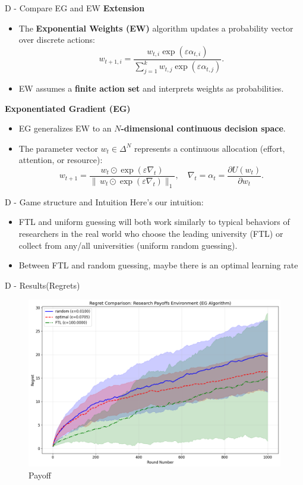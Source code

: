 \documentclass{beamer}
\begin{document}
\begin{frame}{D - Compare EG and EW}
\textbf{Extension}
    \begin{itemize}
        \item The \textbf{Exponential Weights (EW)} algorithm updates 
              a probability vector over discrete actions:
              \[
              w_{t+1,i} 
              = 
              \frac{
                  w_{t,i} \exp(\varepsilon \alpha_{t,i})
              }{
                  \sum_{j=1}^{k} w_{t,j} \exp(\varepsilon \alpha_{t,j})
              }.
              \]
        \item EW assumes a \textbf{finite action set} and interprets weights as probabilities.
    \end{itemize}
\textbf{Exponentiated Gradient (EG)}
    \begin{itemize}
        \item EG generalizes EW to an \textbf{$N$-dimensional continuous decision space}.
        \item The parameter vector $w_t \in \Delta^N$ represents 
              a continuous allocation (effort, attention, or resource):
              \[
              w_{t+1}
              = 
              \frac{
                  w_t \odot \exp(\varepsilon \nabla_t)
              }{
                  \|\,w_t \odot \exp(\varepsilon \nabla_t)\|_1
              },
              \quad
              \nabla_t = \alpha_t = \frac{\partial U(w_t)}{\partial w_t}.
              \]
    \end{itemize}
\end{frame}

\begin{frame}{D - Game structure and Intuition}
Here's our intuition:
\begin{itemize}
    \item FTL and uniform guessing will both work similarly to typical behaviors of researchers in the real world who choose the leading university (FTL) or collect from any/all universities (uniform random guessing).
    \item Between FTL and random guessing, maybe there is an optimal learning rate
\end{itemize}
\end{frame}

\begin{frame}{D - Results(Regrets)}
\begin{figure}
    \centering
    \includegraphics[width=0.5\linewidth]{332Project2/figures/RP_regret.png}
    \caption{Payoff}
    \label{fig:placeholder}
\end{figure}
    
\end{frame}
\end{document}
